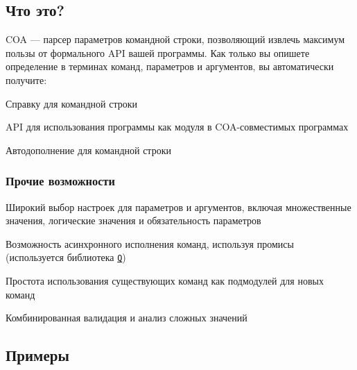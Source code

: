 \href{http://travis-ci.org/veged/coa}{\tt }

\subsection*{Что это?}

C\+OA — парсер параметров командной строки, позволяющий извлечь максимум пользы от формального A\+PI вашей программы. Как только вы опишете определение в терминах команд, параметров и аргументов, вы автоматически получите\+:


\begin{DoxyItemize}
\item Справку для командной строки
\item A\+PI для использования программы как модуля в C\+O\+A-\/совместимых программах
\item Автодополнение для командной строки
\end{DoxyItemize}

\subsubsection*{Прочие возможности}


\begin{DoxyItemize}
\item Широкий выбор настроек для параметров и аргументов, включая множественные значения, логические значения и обязательность параметров
\item Возможность асинхронного исполнения команд, используя промисы (используется библиотека \href{https://github.com/kriskowal/q}{\tt Q})
\item Простота использования существующих команд как подмодулей для новых команд
\item Комбинированная валидация и анализ сложных значений
\end{DoxyItemize}

\subsection*{Примеры}


